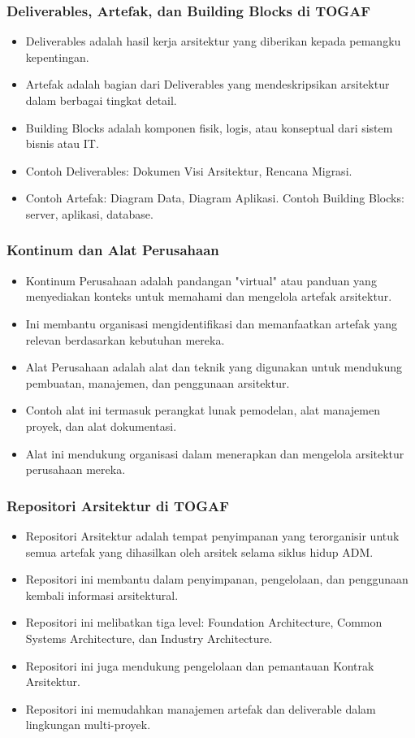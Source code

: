 \documentclass{beamer}
\begin{document}
	\begin{frame}
		\frametitle{Deliverables, Artefak, dan Building Blocks di TOGAF}
		\begin{itemize}
			\item Deliverables adalah hasil kerja arsitektur yang diberikan kepada pemangku kepentingan.
			\item Artefak adalah bagian dari Deliverables yang mendeskripsikan arsitektur dalam berbagai tingkat detail.
			\item Building Blocks adalah komponen fisik, logis, atau konseptual dari sistem bisnis atau IT.
			\item Contoh Deliverables: Dokumen Visi Arsitektur, Rencana Migrasi.
			\item Contoh Artefak: Diagram Data, Diagram Aplikasi. Contoh Building Blocks: server, aplikasi, database.
		\end{itemize}
	\end{frame}
	
	\begin{frame}
		\frametitle{Kontinum dan Alat Perusahaan}
		\begin{itemize}
			\item Kontinum Perusahaan adalah pandangan "virtual" atau panduan yang menyediakan konteks untuk memahami dan mengelola artefak arsitektur.
			\item Ini membantu organisasi mengidentifikasi dan memanfaatkan artefak yang relevan berdasarkan kebutuhan mereka.
			\item Alat Perusahaan adalah alat dan teknik yang digunakan untuk mendukung pembuatan, manajemen, dan penggunaan arsitektur.
			\item Contoh alat ini termasuk perangkat lunak pemodelan, alat manajemen proyek, dan alat dokumentasi.
			\item Alat ini mendukung organisasi dalam menerapkan dan mengelola arsitektur perusahaan mereka.
		\end{itemize}
	\end{frame}
	
	\begin{frame}
		\frametitle{Repositori Arsitektur di TOGAF}
		\begin{itemize}
			\item Repositori Arsitektur adalah tempat penyimpanan yang terorganisir untuk semua artefak yang dihasilkan oleh arsitek selama siklus hidup ADM.
			\item Repositori ini membantu dalam penyimpanan, pengelolaan, dan penggunaan kembali informasi arsitektural.
			\item Repositori ini melibatkan tiga level: Foundation Architecture, Common Systems Architecture, dan Industry Architecture.
			\item Repositori ini juga mendukung pengelolaan dan pemantauan Kontrak Arsitektur.
			\item Repositori ini memudahkan manajemen artefak dan deliverable dalam lingkungan multi-proyek.
		\end{itemize}
	\end{frame}
	
\end{document}
